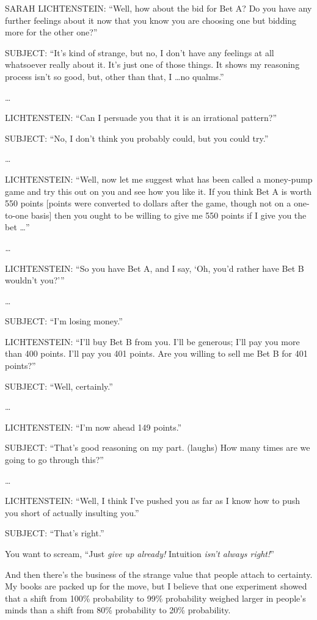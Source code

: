 {
 SARAH LICHTENSTEIN: ``Well, how about the bid for
Bet A? Do you have any further feelings about it now that you know you
are choosing one but bidding more for the other
one?''}

{
 SUBJECT: ``It's kind of strange,
but no, I don't have any feelings at all whatsoever
really about it. It's just one of those things. It
shows my reasoning process isn't so good, but, other
than that, I \ldots no qualms.''}

{
 \ldots}

{
 LICHTENSTEIN: ``Can I persuade you that it is an
irrational pattern?''}

{
 SUBJECT: ``No, I don't think you
probably could, but you could try.''}

{
 \ldots}

{
 LICHTENSTEIN: ``Well, now let me suggest what has
been called a money-pump game and try this out on you and see how you
like it. If you think Bet A is worth 550 points [points were converted
to dollars after the game, though not on a one-to-one basis] then you
ought to be willing to give me 550 points if I give you the bet
\ldots''}

{
 \textit{\ldots}}

{
 LICHTENSTEIN: ``So you have Bet A, and I say,
`Oh, you'd rather have Bet B
wouldn't you?'''}

{
 \ldots}

{
 SUBJECT: ``I'm losing
money.''}

{
 LICHTENSTEIN: ``I'll buy Bet B
from you. I'll be generous; I'll pay
you more than 400 points. I'll pay you 401 points. Are
you willing to sell me Bet B for 401 points?''}

{
 SUBJECT: ``Well, certainly.''}

{
 \ldots}

{
 LICHTENSTEIN: ``I'm now ahead 149
points.''}

{
 SUBJECT: ``That's good reasoning
on my part. (laughs) How many times are we going to go through
this?''}

{
 \ldots}

{
 LICHTENSTEIN: ``Well, I think
I've pushed you as far as I know how to push you short
of actually insulting you.''}

{
 SUBJECT: ``That's
right.''}

{
 You want to scream, ``Just \textit{give up
already!} Intuition \textit{isn't always
right!}''}

{
 And then there's the business of the strange value
that people attach to certainty. My books are packed up for the move,
but I believe that one experiment showed that a shift from 100\%
probability to 99\% probability weighed larger in
people's minds than a shift from 80\% probability to
20\% probability.}

